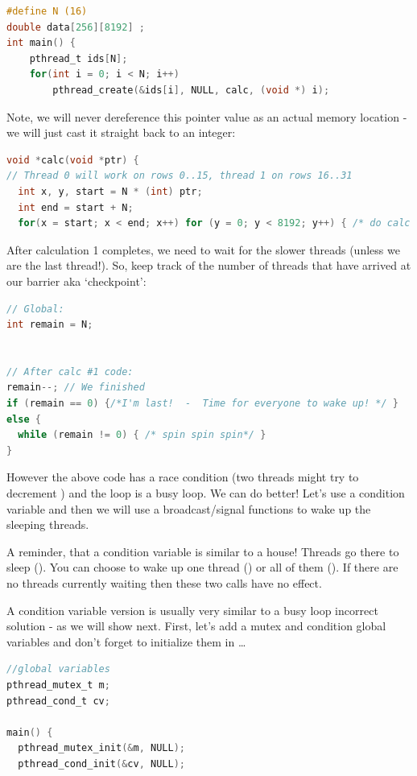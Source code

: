 \begin{lstlisting}[language=C]
#define N (16)
double data[256][8192] ;
int main() {
    pthread_t ids[N];
    for(int i = 0; i < N; i++)  
        pthread_create(&ids[i], NULL, calc, (void *) i);
\end{lstlisting}

Note, we will never dereference this pointer value as an actual memory location - we will just cast it straight back to an integer:

\begin{lstlisting}[language=C]
void *calc(void *ptr) {
// Thread 0 will work on rows 0..15, thread 1 on rows 16..31
  int x, y, start = N * (int) ptr;
  int end = start + N; 
  for(x = start; x < end; x++) for (y = 0; y < 8192; y++) { /* do calc #1 */ }
\end{lstlisting}

After calculation 1 completes, we need to wait for the slower threads (unless we are the last thread!). So, keep track of the number of threads that have arrived at our barrier aka `checkpoint':

\begin{lstlisting}[language=C]
// Global: 
int remain = N;


// After calc #1 code:
remain--; // We finished
if (remain == 0) {/*I'm last!  -  Time for everyone to wake up! */ }
else {
  while (remain != 0) { /* spin spin spin*/ }
}
\end{lstlisting}

However the above code has a race condition (two threads might try to decrement ) and the loop is a busy loop. We can do better! Let's use a condition variable and then we will use a broadcast/signal functions to wake up the sleeping threads.

A reminder, that a condition variable is similar to a house! Threads go there to sleep (). You can choose to wake up one thread () or all of them (). If there are no threads currently waiting then these two calls have no effect.

A condition variable version is usually very similar to a busy loop incorrect solution - as we will show next. First, let's add a mutex and condition global variables and don't forget to initialize them in  \ldots{}

\begin{lstlisting}[language=C]
//global variables
pthread_mutex_t m;
pthread_cond_t cv;

main() {
  pthread_mutex_init(&m, NULL);
  pthread_cond_init(&cv, NULL);
\end{lstlisting}

